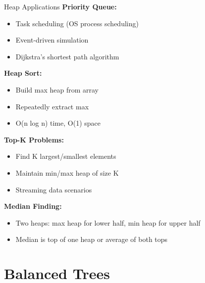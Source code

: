 \documentclass[aspectratio=169]{beamer}
\begin{document}
\begin{frame}{Heap Applications}
  \textbf{Priority Queue:}
  \begin{itemize}
    \item Task scheduling (OS process scheduling)
    \item Event-driven simulation
    \item Dijkstra's shortest path algorithm
  \end{itemize}

  \vspace{0.3cm}
  \textbf{Heap Sort:}
  \begin{itemize}
    \item Build max heap from array
    \item Repeatedly extract max
    \item O(n log n) time, O(1) space
  \end{itemize}

  \vspace{0.3cm}
  \textbf{Top-K Problems:}
  \begin{itemize}
    \item Find K largest/smallest elements
    \item Maintain min/max heap of size K
    \item Streaming data scenarios
  \end{itemize}

  \vspace{0.3cm}
  \textbf{Median Finding:}
  \begin{itemize}
    \item Two heaps: max heap for lower half, min heap for upper half
    \item Median is top of one heap or average of both tops
  \end{itemize}
\end{frame}

\section{Balanced Trees}
\end{document}
